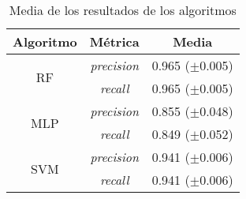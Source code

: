 \begin{table}[htbp!]
    \centering
    \begin{tabular}{c c c }
        \toprule
        Algoritmo            & Métrica   & Media              \\
        \midrule \midrule
        \multirow{2}{*}{RF}  & \textit{precision} & 0.965 ($\pm$0.005) \\
                             & \textit{recall}    & 0.965 ($\pm$0.005) \\ \midrule
        \multirow{2}{*}{MLP} & \textit{precision} & 0.855 ($\pm$0.048) \\
                             & \textit{recall}    & 0.849 ($\pm$0.052) \\ \midrule
        \multirow{2}{*}{SVM} & \textit{precision} & 0.941 ($\pm$0.006) \\
                             & \textit{recall}    & 0.941 ($\pm$0.006) \\
        \bottomrule
    \end{tabular}
    \caption{Media de los resultados de los algoritmos}
    \label{tab:compare_clf}
\end{table}




